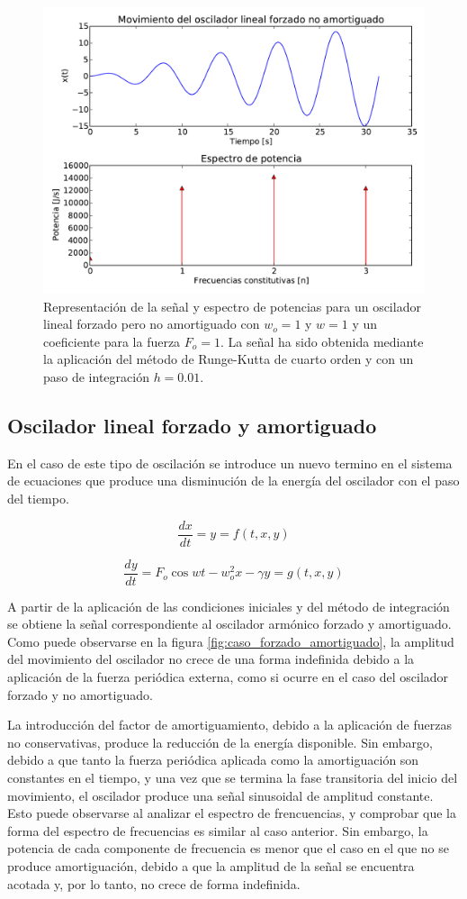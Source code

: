 \documentclass[11pt]{article}
\begin{document}
\begin{figure}
\centering
\includegraphics[width=0.75\linewidth]{caso_forzado.pdf}
\caption{Representación de la señal y espectro de potencias para un oscilador lineal forzado pero no amortiguado con $w_o = 1$ y $w = 1$ y un coeficiente para la fuerza $F_o = 1$. La señal ha sido obtenida mediante la aplicación del método de Runge-Kutta de cuarto orden y con un paso de integración $h = 0.01$.}
\label{fig:caso_forzado}
\end{figure}

\subsection{Oscilador lineal forzado y amortiguado}
En el caso de este tipo de oscilación se introduce un nuevo termino en el sistema de ecuaciones que produce una disminución de la energía del oscilador con el paso del tiempo.

\begin{equation}
	\frac{dx}{dt} = y = f(t, x, y)
\end{equation}

\begin{equation}
	\frac{dy}{dt} = F_o\cos{wt} - w_o^2 x - \gamma{}y = g(t, x, y) 	
\end{equation}

A partir de la aplicación de las condiciones iniciales y del método de integración se obtiene la señal correspondiente al oscilador armónico forzado y amortiguado. Como puede observarse en la figura \ref{fig:caso_forzado_amortiguado}, la amplitud del movimiento del oscilador no crece de una forma indefinida debido a la aplicación de la fuerza periódica externa, como si ocurre en el caso del oscilador forzado y no amortiguado.

La introducción del factor de amortiguamiento, debido a la aplicación de fuerzas no conservativas, produce la reducción de la energía disponible. Sin embargo, debido a que tanto la fuerza periódica aplicada como la amortiguación son constantes en el tiempo, y una vez que se termina la fase transitoria del inicio del movimiento, el oscilador produce una señal sinusoidal de amplitud constante. Esto puede observarse al analizar el espectro de frencuencias, y comprobar que la forma del espectro de frecuencias es similar al caso anterior. Sin embargo, la potencia de cada componente de frecuencia es menor que el caso en el que no se produce amortiguación, debido a que la amplitud de la señal se encuentra acotada y, por lo tanto, no crece de forma indefinida.
\end{document}

